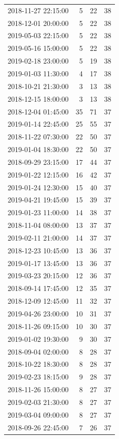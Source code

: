 \begin{tabular}{lrrr}
2018-11-27 22:15:00 & 5 & 22 & 38 \\
2018-12-01 20:00:00 & 5 & 22 & 38 \\
2019-05-03 22:15:00 & 5 & 22 & 38 \\
2019-05-16 15:00:00 & 5 & 22 & 38 \\
2019-02-18 23:00:00 & 5 & 19 & 38 \\
2019-01-03 11:30:00 & 4 & 17 & 38 \\
2018-10-21 21:30:00 & 3 & 13 & 38 \\
2018-12-15 18:00:00 & 3 & 13 & 38 \\
2018-12-04 01:45:00 & 35 & 71 & 37 \\
2019-01-14 22:45:00 & 25 & 55 & 37 \\
2018-11-22 07:30:00 & 22 & 50 & 37 \\
2019-01-04 18:30:00 & 22 & 50 & 37 \\
2018-09-29 23:15:00 & 17 & 44 & 37 \\
2019-01-22 12:15:00 & 16 & 42 & 37 \\
2019-01-24 12:30:00 & 15 & 40 & 37 \\
2019-04-21 19:45:00 & 15 & 39 & 37 \\
2019-01-23 11:00:00 & 14 & 38 & 37 \\
2018-11-04 08:00:00 & 13 & 37 & 37 \\
2019-02-11 21:00:00 & 14 & 37 & 37 \\
2018-12-23 10:45:00 & 13 & 36 & 37 \\
2019-01-17 13:45:00 & 13 & 36 & 37 \\
2019-03-23 20:15:00 & 12 & 36 & 37 \\
2018-09-14 17:45:00 & 12 & 35 & 37 \\
2018-12-09 12:45:00 & 11 & 32 & 37 \\
2019-04-26 23:00:00 & 10 & 31 & 37 \\
2018-11-26 09:15:00 & 10 & 30 & 37 \\
2019-01-02 19:30:00 & 9 & 30 & 37 \\
2018-09-04 02:00:00 & 8 & 28 & 37 \\
2018-10-22 18:30:00 & 8 & 28 & 37 \\
2019-02-23 18:15:00 & 9 & 28 & 37 \\
2018-11-26 15:00:00 & 8 & 27 & 37 \\
2019-02-03 21:30:00 & 8 & 27 & 37 \\
2019-03-04 09:00:00 & 8 & 27 & 37 \\
2018-09-26 22:45:00 & 7 & 26 & 37 \\

\end{tabular}
